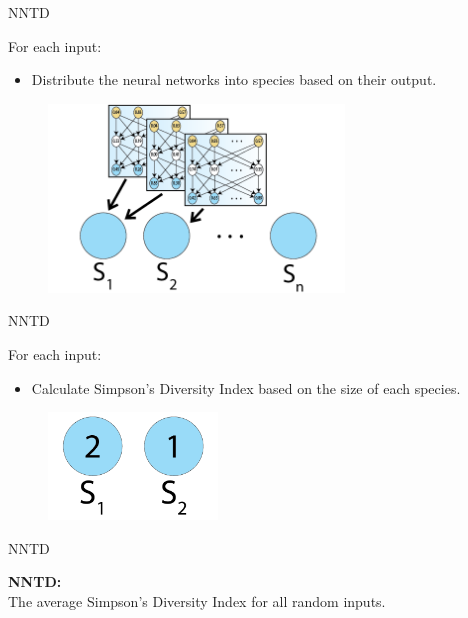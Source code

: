\begin{frame}{NNTD}
\begin{center}
For each input:
  \begin{itemize}
	  \item Distribute the neural networks into species based on their output.
  \end{itemize}
     \begin{figure}[p]
  \includegraphics[width=0.7\textwidth]{images/speciesnn.png}
  \end{figure}
\end{center}
\end{frame}

\begin{frame}{NNTD}
\begin{center}
For each input:
  \begin{itemize}
	  \item Calculate Simpson's Diversity Index based on the size of each species.
  \end{itemize}
     \begin{figure}[p]
  \includegraphics[width=0.4\textwidth]{images/speciessize.png}
  \end{figure}
\end{center}
\end{frame}

\begin{frame}{NNTD}
\begin{center}
\textbf{NNTD:}\\
The average Simpson's Diversity Index for all random inputs.
\end{center}
\end{frame}

